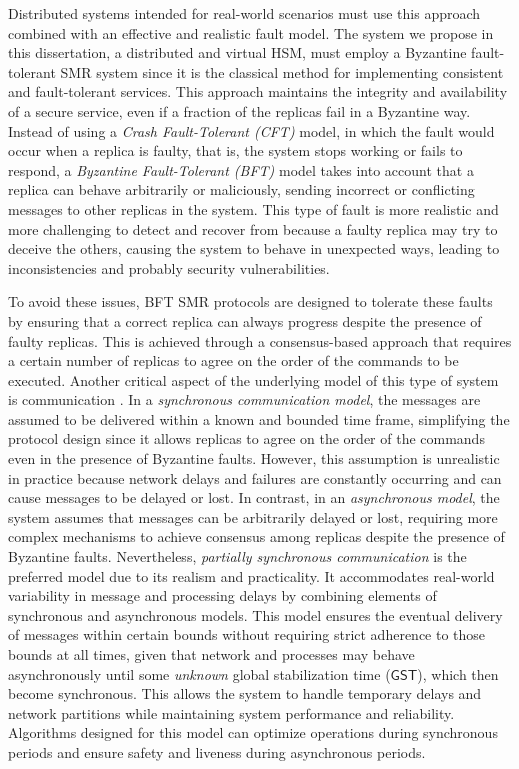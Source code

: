 Distributed systems intended for real-world scenarios must use this approach combined with an effective and realistic fault model. The system we propose in this dissertation, a distributed and virtual HSM, must employ a Byzantine fault-tolerant SMR system since it is the classical method for implementing consistent and fault-tolerant services. This approach maintains the integrity and availability of a secure service, even if a fraction of the replicas fail in a Byzantine way. Instead of using a \textit{Crash Fault-Tolerant (CFT)} model, in which the fault would occur when a replica is faulty, that is, the system stops working or fails to respond, a \textit{Byzantine Fault-Tolerant (BFT)} model takes into account that a replica can behave arbitrarily or maliciously, sending incorrect or conflicting messages to other replicas in the system. This type of fault is more realistic and more challenging to detect and recover from because a faulty replica may try to deceive the others, causing the system to behave in unexpected ways, leading to inconsistencies and probably security vulnerabilities.

To avoid these issues, BFT SMR protocols are designed to tolerate these faults by ensuring that a correct replica can always progress despite the presence of faulty replicas. This is achieved through a consensus-based approach that requires a certain number of replicas to agree on the order of the commands to be executed. Another critical aspect of the underlying model of this type of system is communication \cite{commsmodel}.
In a \textit{synchronous communication model}, the messages are assumed to be delivered within a known and bounded time frame, simplifying the protocol design since it allows replicas to agree on the order of the commands even in the presence of Byzantine faults. However, this assumption is unrealistic in practice because network delays and failures are constantly occurring and can cause messages to be delayed or lost.
In contrast, in an \textit{asynchronous model}, the system assumes that messages can be arbitrarily delayed or lost, requiring more complex mechanisms to achieve consensus among replicas despite the presence of Byzantine faults.
Nevertheless, \textit{partially synchronous communication} \cite{partiallysynchronous} is the preferred model due to its realism and practicality. It accommodates real-world variability in message and processing delays by combining elements of synchronous and asynchronous models. This model ensures the eventual delivery of messages within certain bounds without requiring strict adherence to those bounds at all times, given that network and processes may behave asynchronously until some \textit{unknown} global stabilization time ($\mathsf{GST}$), which then become synchronous. This allows the system to handle temporary delays and network partitions while maintaining system performance and reliability. Algorithms designed for this model can optimize operations during synchronous periods and ensure safety and liveness during asynchronous periods. 

